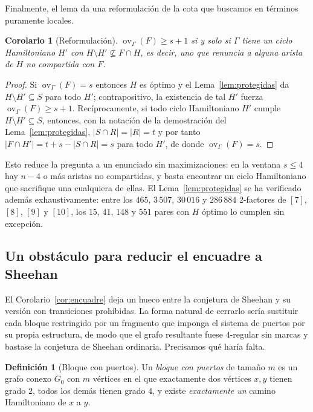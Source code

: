 \documentclass[11pt,a4paper]{article}
\newtheorem{corolario}[teorema]{Corolario}
\theoremstyle{definition}
\newtheorem{definicion}[teorema]{Definición}
\theoremstyle{remark}
\newcommand{\ov}{\operatorname{ov}}
\begin{document}
Finalmente, el lema da una reformulación de la cota que buscamos en términos puramente locales.

\begin{corolario}[Reformulación]\label{cor:reform}
$\ov_\Gamma(F)\ge s+1$ si y solo si $\Gamma$ tiene un ciclo Hamiltoniano $H'$ con $H\setminus H'\not\subseteq F\cap H$, es decir, uno que renuncia a alguna arista de $H$ \emph{no} compartida con $F$.
\end{corolario}

\begin{proof}
Si $\ov_\Gamma(F)=s$ entonces $H$ es óptimo y el Lema~\ref{lem:protegidas} da $H\setminus H'\subseteq S$ para todo $H'$; contrapositivo, la existencia de tal $H'$ fuerza $\ov_\Gamma(F)\ge s+1$. Recíprocamente, si todo ciclo Hamiltoniano $H'$ cumple $H\setminus H'\subseteq S$, entonces, con la notación de la demostración del Lema~\ref{lem:protegidas}, $|S\cap R|=|R|=t$ y por tanto $|F\cap H'|=t+s-|S\cap R|=s$ para todo $H'$, de donde $\ov_\Gamma(F)=s$.
\end{proof}

Esto reduce la pregunta a un enunciado sin maximizaciones: en la ventana $s\le4$ hay $n-4$ o más aristas no compartidas, y basta encontrar un ciclo Hamiltoniano que sacrifique una cualquiera de ellas. El Lema~\ref{lem:protegidas} se ha verificado además exhaustivamente: entre los $465$, $3\,507$, $30\,016$ y $286\,884$ 2-factores de $[7]$, $[8]$, $[9]$ y $[10]$, los $15$, $41$, $148$ y $551$ pares con $H$ óptimo lo cumplen sin excepción.

\subsection{Un obstáculo para reducir el encuadre a Sheehan}

El Corolario~\ref{cor:encuadre} deja un hueco entre la conjetura de Sheehan y su versión con transiciones prohibidas. La forma natural de cerrarlo sería sustituir cada bloque restringido por un fragmento que imponga el sistema de puertos por su propia estructura, de modo que el grafo resultante fuese $4$-regular sin marcas y bastase la conjetura de Sheehan ordinaria. Precisamos qué haría falta.

\begin{definicion}[Bloque con puertos]\label{def:gadget}
Un \emph{bloque con puertos} de tamaño $m$ es un grafo conexo $G_0$ con $m$ vértices en el que exactamente dos vértices $x,y$ tienen grado $2$, todos los demás tienen grado $4$, y existe \emph{exactamente un} camino Hamiltoniano de $x$ a $y$.
\end{definicion}
\end{document}
